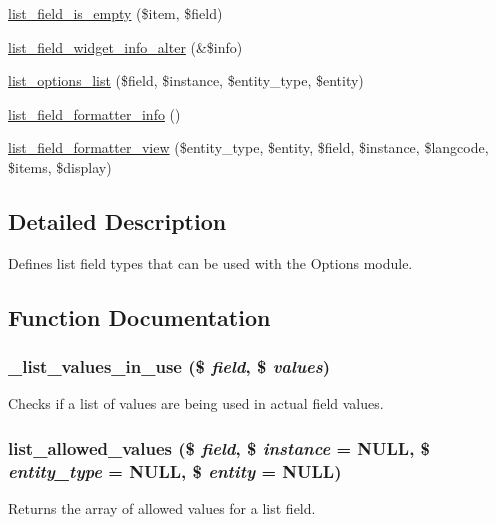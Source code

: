 \begin{DoxyCompactItemize}
\item 
\hyperlink{list_8module_a786db9c0c17b7e8be8f308ad9270deb6}{list\_\-field\_\-is\_\-empty} (\$item, \$field)
\item 
\hyperlink{list_8module_a083f26acdff7696710aefa11970801bd}{list\_\-field\_\-widget\_\-info\_\-alter} (\&\$info)
\item 
\hyperlink{list_8module_a3f9af78b260cdcf9c3a2f44df102e7e4}{list\_\-options\_\-list} (\$field, \$instance, \$entity\_\-type, \$entity)
\item 
\hyperlink{list_8module_a12250051f9751c4016a9e7fa0403223b}{list\_\-field\_\-formatter\_\-info} ()
\item 
\hyperlink{list_8module_a8747111b6404b34d812a851224ea2062}{list\_\-field\_\-formatter\_\-view} (\$entity\_\-type, \$entity, \$field, \$instance, \$langcode, \$items, \$display)
\end{DoxyCompactItemize}


\subsection{Detailed Description}
Defines list field types that can be used with the Options module. 

\subsection{Function Documentation}
\hypertarget{list_8module_a0b84a7d7dd9ccad6ee17784192eb5b9b}{
\subsubsection[{\_\-list\_\-values\_\-in\_\-use}]{\setlength{\rightskip}{0pt plus 5cm}\_\-list\_\-values\_\-in\_\-use (\$ {\em field}, \/  \$ {\em values})}}
\label{list_8module_a0b84a7d7dd9ccad6ee17784192eb5b9b}
Checks if a list of values are being used in actual field values. \hypertarget{list_8module_a218d8f625fd18ca24e8cf7e3770bc576}{
\subsubsection[{list\_\-allowed\_\-values}]{\setlength{\rightskip}{0pt plus 5cm}list\_\-allowed\_\-values (\$ {\em field}, \/  \$ {\em instance} = {\ttfamily NULL}, \/  \$ {\em entity\_\-type} = {\ttfamily NULL}, \/  \$ {\em entity} = {\ttfamily NULL})}}
\label{list_8module_a218d8f625fd18ca24e8cf7e3770bc576}
Returns the array of allowed values for a list field.


